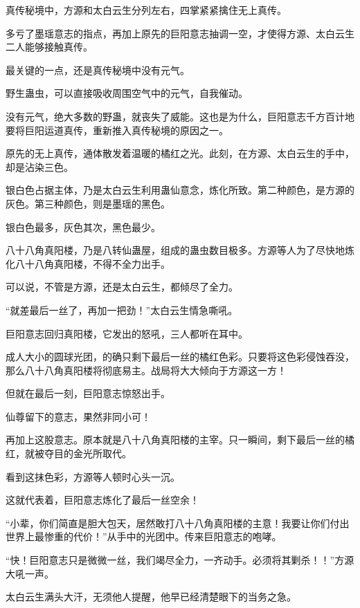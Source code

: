 
\begin{this_body}



真传秘境中，方源和太白云生分列左右，四掌紧紧擒住无上真传。

多亏了墨瑶意志的指点，再加上原先的巨阳意志抽调一空，才使得方源、太白云生二人能够接触真传。

最关键的一点，还是真传秘境中没有元气。

野生蛊虫，可以直接吸收周围空气中的元气，自我催动。

没有元气，绝大多数的野蛊，就丧失了威能。这也是为什么，巨阳意志千方百计地要将巨阳运道真传，重新推入真传秘境的原因之一。

原先的无上真传，通体散发着温暖的橘红之光。此刻，在方源、太白云生的手中，却是沾染三色。

银白色占据主体，乃是太白云生利用蛊仙意念，炼化所致。第二种颜色，是方源的灰色。第三种颜色，则是墨瑶的黑色。

银白色最多，灰色其次，黑色最少。

八十八角真阳楼，乃是八转仙蛊屋，组成的蛊虫数目极多。方源等人为了尽快地炼化八十八角真阳楼，不得不全力出手。

可以说，不管是方源，还是太白云生，都倾尽了全力。

“就差最后一丝了，再加一把劲！”太白云生情急嘶吼。

巨阳意志回归真阳楼，它发出的怒吼，三人都听在耳中。

成人大小的圆球光团，的确只剩下最后一丝的橘红色彩。只要将这色彩侵蚀吞没，那么八十八角真阳楼将彻底易主。战局将大大倾向于方源这一方！

但就在最后一刻，巨阳意志惊怒出手。

仙尊留下的意志，果然非同小可！

再加上这股意志。原本就是八十八角真阳楼的主宰。只一瞬间，剩下最后一丝的橘红，就被夺目的金光所取代。

看到这抹色彩，方源等人顿时心头一沉。

这就代表着，巨阳意志炼化了最后一丝空余！

“小辈，你们简直是胆大包天，居然敢打八十八角真阳楼的主意！我要让你们付出世界上最惨重的代价！”从手中的光团中。传来巨阳意志的咆哮。

“快！巨阳意志只是微微一丝，我们竭尽全力，一齐动手。必须将其剿杀！！”方源大吼一声。

太白云生满头大汗，无须他人提醒，他早已经清楚眼下的当务之急。


\end{this_body}
